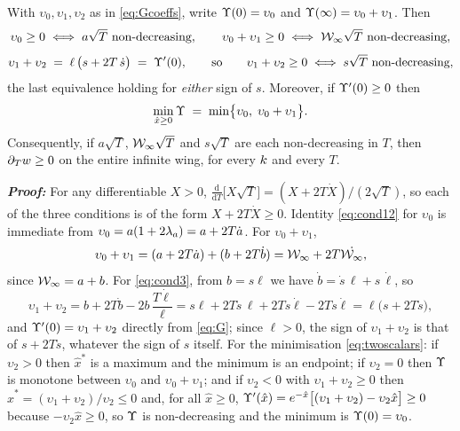 \begin{theorem}\label{thm:wingreduction}
With $\upsilon_{0},\upsilon_{1},\upsilon_{2}$ as in \eqref{eq:Gcoeffs}, write $\Upsilon(0)=\upsilon_{0}$
and $\Upsilon(\infty)=\upsilon_{0}+\upsilon_{1}$. Then
\begin{equation}
  \upsilon_{0}\ge0 \iff a\sqrt{T}\ \text{non-decreasing},\qquad
  \upsilon_{0}+\upsilon_{1}\ge0 \iff \Winf\sqrt{T}\ \text{non-decreasing},
  \label{eq:cond12}
\end{equation}
\begin{equation}
  \upsilon_{1}+\upsilon_{2}\;=\;\ell\,\bigl(s+2T\,\dot s\bigr)\;=\;\Upsilon'(0),
  \qquad\text{so}\qquad
  \upsilon_{1}+\upsilon_{2}\ge0 \iff s\sqrt{T}\ \text{non-decreasing},
  \label{eq:cond3}
\end{equation}
the last equivalence holding for \emph{either} sign of $s$. Moreover, if $\Upsilon'(0)\ge0$ then
\begin{equation}\label{eq:twoscalars}
  \min_{\hat{x}\ge0}\Upsilon\;=\;\min\bigl\{\upsilon_{0},\;\upsilon_{0}+\upsilon_{1}\bigr\}.
\end{equation}
Consequently, if $a\sqrt{T}$, $\mathcal{W}_{\infty}\sqrt{T}$ and $s\sqrt{T}$ are each non-decreasing in $T$, then
$\partial_{T}w\ge0$ on the entire infinite wing, for every $k$ and every $T$.
\end{theorem}

\textbf{\textit{Proof:}}
For any differentiable $X>0$,
$\tfrac{\mathrm{d}}{\mathrm{d}T}\bigl[X\sqrt{T}\bigr]=(X+2T\dot X)/(2\sqrt{T})$, so each of the three
conditions is of the form $X+2T\dot X\ge0$. Identity \eqref{eq:cond12} for $\upsilon_{0}$ is immediate
from $\upsilon_{0}=a(1+2\lambda_{a})=a+2T\dot a$. For $\upsilon_{0}+\upsilon_{1}$,
\[
  \upsilon_{0}+\upsilon_{1}=(a+2T\dot a)+(b+2T\dot b)=\mathcal{W}_{\infty}+2T\dot{\mathcal{W}_{\infty}},
\]
since $\mathcal{W}_{\infty}=a+b$. For \eqref{eq:cond3}, from $b=s\ell$ we have $\dot b=\dot s\,\ell+s\,\dot\ell$, so
\[
  \upsilon_{1}+\upsilon_{2}=b+2T\dot b-2b\,\frac{T\dot\ell}{\ell}
  =s\ell+2T\dot s\,\ell+2Ts\dot\ell-2Ts\dot\ell=\ell\bigl(s+2T\dot s\bigr),
\]
and $\Upsilon'(0)=\upsilon_{1}+\upsilon_{2}$ directly from \eqref{eq:G}; since $\ell>0$, the sign of
$\upsilon_{1}+\upsilon_{2}$ is that of $s+2T\dot s$, whatever the sign of $s$ itself. For the
minimisation \eqref{eq:twoscalars}: if $\upsilon_{2}>0$ then $\hat{x}^{*}$ is a maximum and the
minimum is an endpoint; if $\upsilon_{2}=0$ then $\Upsilon$ is monotone between $\upsilon_{0}$ and
$\upsilon_{0}+\upsilon_{1}$; and if $\upsilon_{2}<0$ with $\upsilon_{1}+\upsilon_{2}\ge0$ then
$\hat{x}^{*}=(\upsilon_{1}+\upsilon_{2})/\upsilon_{2}\le0$ and, for all $\hat{x}\ge0$,
$\Upsilon'(\hat{x})=e^{-\hat{x}}\bigl[(\upsilon_{1}+\upsilon_{2})-\upsilon_{2}\hat{x}\bigr]\ge0$
because $-\upsilon_{2}\hat{x}\ge0$, so $\Upsilon$ is non-decreasing and the minimum is
$\Upsilon(0)=\upsilon_{0}$. \qedfilledtext

